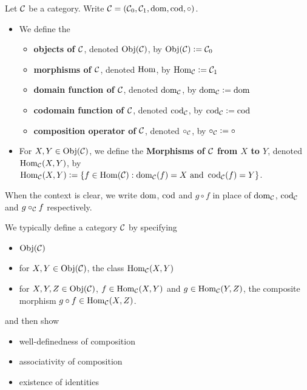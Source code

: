 \documentclass{book}
\begin{document}
	\begin{defn}
		Let $\mathcal{C}$ be a category. Write $\mathcal{C} = (\mathcal{C}_0, \mathcal{C}_1, \operatorname{dom}, \operatorname{cod}, \circ)$.
		\begin{itemize}
			\item We define the
			\begin{itemize}
				\item \textbf{objects of $\mathcal{C}$}, denoted $\operatorname{Obj}(\mathcal{C})$, by $\operatorname{Obj}(\mathcal{C}) \vcentcolon= \mathcal{C}_0$
				\item \textbf{morphisms of $\mathcal{C}$}, denoted $\operatorname{Hom}$, by $\operatorname{Hom}_{\mathcal{C}} \vcentcolon= \mathcal{C}_1$ 
				\item \textbf{domain function of $\mathcal{C}$}, denoted $\operatorname{dom}_{\mathcal{C}}$, by $\operatorname{dom}_{\mathcal{C}} \vcentcolon= \operatorname{dom}$
				\item \textbf{codomain function of $\mathcal{C}$}, denoted $\operatorname{cod}_{\mathcal{C}}$, by $\operatorname{cod}_{\mathcal{C}} \vcentcolon= \operatorname{cod}$
				\item \textbf{composition operator of $\mathcal{C}$}, denoted $\circ_{\mathcal{C}}$, by $\circ_{\mathcal{C}} \vcentcolon= \circ$
			\end{itemize}
			\item For $X, Y \in \operatorname{Obj}(\mathcal{C})$, we define the \textbf{Morphisms of $\mathcal{C}$ from $X$ to $Y$}, denoted $\operatorname{Hom}_{\mathcal{C}}(X, Y)$, by $\operatorname{Hom}_{\mathcal{C}}(X, Y) \vcentcolon= \{f \in \operatorname{Hom}(\mathcal{C}): \operatorname{dom}_{\mathcal{C}}(f) = X \text{ and } \operatorname{cod}_{\mathcal{C}}(f) = Y\}$.
		\end{itemize}
	\end{defn}

	\begin{note}
		When the context is clear, we write $\operatorname{dom}$, $\operatorname{cod}$ and $g \circ f$ in place of $\operatorname{dom}_{\mathcal{C}}$, $\operatorname{cod}_{\mathcal{C}}$ and $g \circ_{\mathcal{C}} f$ respectively.
	\end{note}

	\begin{note} 
		We typically define a category $\mathcal{C}$ by specifying 
		\begin{itemize}
			\item $\operatorname{Obj}(\mathcal{C})$
			\item for $X,Y \in \operatorname{Obj}(\mathcal{C})$, the class $\operatorname{Hom}_{\mathcal{C}}(X, Y)$
			\item for $X,Y,Z \in \operatorname{Obj}(\mathcal{C})$, $f \in \operatorname{Hom}_{\mathcal{C}}(X, Y)$ and $g \in \operatorname{Hom}_{\mathcal{C}}(Y, Z)$, the composite morphism $g \circ f \in \operatorname{Hom}_{\mathcal{C}}(X,Z)$.
		\end{itemize}
		and then show 
		\begin{itemize}
			\item well-definedness of composition
			\item associativity of composition 
			\item existence of identities 
		\end{itemize}
	\end{note}
	
\end{document}
